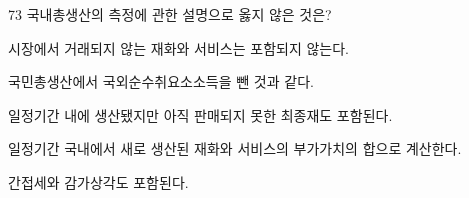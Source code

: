 \begin{question}{73}
국내총생산의 측정에 관한 설명으로 옳지 않은 것은?
\begin{choices}
  \item 시장에서 거래되지 않는 재화와 서비스는 포함되지 않는다.
  \item 국민총생산에서 국외순수취요소소득을 뺀 것과 같다.
  \item 일정기간 내에 생산됐지만 아직 판매되지 못한 최종재도 포함된다.
  \item 일정기간 국내에서 새로 생산된 재화와 서비스의 부가가치의 합으로 계산한다.
  \item 간접세와 감가상각도 포함된다.
\end{choices}
\end{question}
